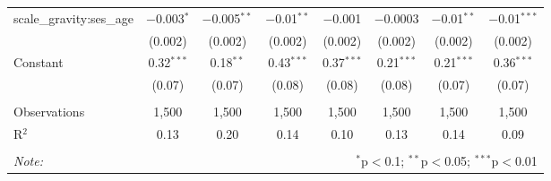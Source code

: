 \documentclass[
]{article}
\begin{document}
\begin{sidewaystable}[!htbp]
\begin{tabular}{@{\extracolsep{1pt}}lccccccc}
  scale\_gravity:ses\_age & $-$0.003$^{*}$ & $-$0.005$^{**}$ & $-$0.01$^{**}$ & $-$0.001 & $-$0.0003 & $-$0.01$^{**}$ & $-$0.01$^{***}$ \\ 
  & (0.002) & (0.002) & (0.002) & (0.002) & (0.002) & (0.002) & (0.002) \\ 
  Constant & 0.32$^{***}$ & 0.18$^{**}$ & 0.43$^{***}$ & 0.37$^{***}$ & 0.21$^{***}$ & 0.21$^{***}$ & 0.36$^{***}$ \\ 
  & (0.07) & (0.07) & (0.08) & (0.08) & (0.08) & (0.07) & (0.07) \\ 
 \hline \\[-1.8ex] 
Observations & 1,500 & 1,500 & 1,500 & 1,500 & 1,500 & 1,500 & 1,500 \\ 
R$^{2}$ & 0.13 & 0.20 & 0.14 & 0.10 & 0.13 & 0.14 & 0.09 \\ 
\hline 
\hline \\[-1.8ex] 
\textit{Note:}  & \multicolumn{7}{r}{$^{*}$p$<$0.1; $^{**}$p$<$0.05; $^{***}$p$<$0.01} \\ 
\end{tabular} 
\end{sidewaystable}
\end{document}
